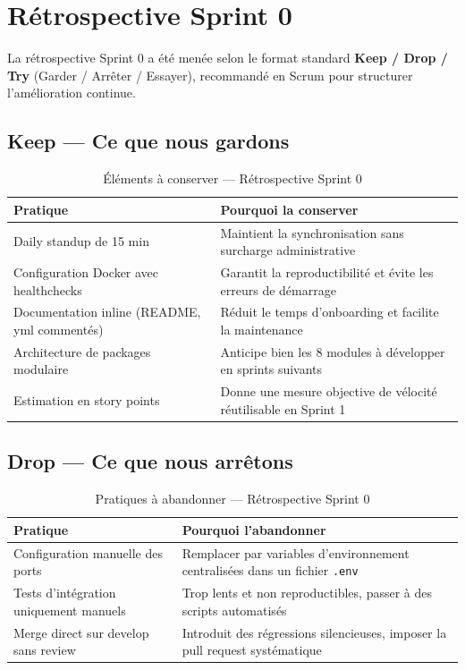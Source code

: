 \documentclass[12pt,a4paper]{report}
\begin{document}
\section{Rétrospective Sprint 0}

La rétrospective Sprint 0 a été menée selon le format standard \textbf{Keep / Drop / Try} (Garder / Arrêter / Essayer), recommandé en Scrum pour structurer l'amélioration continue.

\subsection{Keep — Ce que nous gardons}

\begin{table}[H]
\centering
\caption{Éléments à conserver — Rétrospective Sprint 0}
\begin{tabular}{|p{4cm}|p{9.5cm}|}
\hline
\textbf{Pratique} & \textbf{Pourquoi la conserver} \\
\hline
Daily standup de 15 min & Maintient la synchronisation sans surcharge administrative \\
\hline
Configuration Docker avec healthchecks & Garantit la reproductibilité et évite les erreurs de démarrage \\
\hline
Documentation inline (README, yml commentés) & Réduit le temps d'onboarding et facilite la maintenance \\
\hline
Architecture de packages modulaire & Anticipe bien les 8 modules à développer en sprints suivants \\
\hline
Estimation en story points & Donne une mesure objective de vélocité réutilisable en Sprint 1 \\
\hline
\end{tabular}
\end{table}

\subsection{Drop — Ce que nous arrêtons}

\begin{table}[H]
\centering
\caption{Pratiques à abandonner — Rétrospective Sprint 0}
\begin{tabular}{|p{4cm}|p{9.5cm}|}
\hline
\textbf{Pratique} & \textbf{Pourquoi l'abandonner} \\
\hline
Configuration manuelle des ports & Remplacer par variables d'environnement centralisées dans un fichier \texttt{.env} \\
\hline
Tests d'intégration uniquement manuels & Trop lents et non reproductibles, passer à des scripts automatisés \\
\hline
Merge direct sur develop sans review & Introduit des régressions silencieuses, imposer la pull request systématique \\
\hline
\end{tabular}
\end{table}
\end{document}
